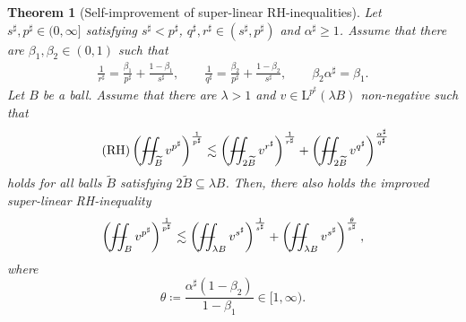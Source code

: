 \documentclass[10pt,a4paper]{amsart}
\newtheorem{theorem}{Theorem}
\renewcommand{\L}{\mathrm{L}}
\def\YYint#1#2#3{{\setbox0=\hbox{$#1{#2#3}{\iint}$}
		\vcenter{\hbox{$#2#3$}}\kern-.51\wd0}}
\def\Yint#1{\mathchoice
	{\YYint\displaystyle\textstyle{#1}}%
	{\YYint\textstyle\scriptstyle{#1}}%
	{\YYint\scriptstyle\scriptscriptstyle{#1}}%
	{\YYint\scriptscriptstyle\scriptscriptstyle{#1}}%
	\!\iint}
\def\longdash{{-}\mkern-3.5mu{-}}
\def\tiltfiint{\Yint\longdash}
\newcommand{\wt}{\widetilde}
\begin{document}
	\begin{theorem}[Self-improvement of super-linear RH-inequalities]
		\label{thm:rh_improvement}
		Let $s^\sharp, p^\sharp \in (0,\infty]$ satisfying $s^\sharp < p^\sharp$, $q^\sharp, r^\sharp \in (s^\sharp, p^\sharp)$ and $\alpha^\sharp \geq 1$. Assume that there are $\beta_1, \beta_2 \in (0,1)$ such that
		\begin{align}
			\label{eq:rh_improvement_relations}
			\frac{1}{r^\sharp} = \frac{\beta_1}{p^\sharp} + \frac{1-\beta_1}{s^\sharp}, \qquad \frac{1}{q^\sharp} = \frac{\beta_2}{p^\sharp} + \frac{1-\beta_2}{s^\sharp}, \qquad \beta_2 \alpha^\sharp = \beta_1.
		\end{align}
		Let $B$ be a ball. Assume that there are $\lambda > 1$ and $v\in \L^{p^\sharp}(\lambda B)$ non-negative such that
		\begin{align}
			\label{eq:RH_assumption}
			\tag{RH}
			\left( \tiltfiint_{\wt B} v^{p^\sharp} \right)^\frac{1}{p^\sharp} \lesssim {\left( \tiltfiint_{2\wt B} v^{r^\sharp} \right)^\frac{1}{r^\sharp} + \left( \tiltfiint_{2\wt B} v^{q^\sharp} \right)^\frac{\alpha^\sharp}{q^\sharp}}
		\end{align}
		holds for all balls $\wt B$ satisfying {$2 \wt B \subseteq \lambda B$}.
		Then, there also holds the improved super-linear RH-inequality
		\begin{align}
			\left( \tiltfiint_{B} v^{p^\sharp} \right)^\frac{1}{p^\sharp} \lesssim \left( \tiltfiint_{\lambda B} v^{s^\sharp} \right)^\frac{1}{s^\sharp} + \left( \tiltfiint_{\lambda B} v^{s^\sharp} \right)^\frac{\theta}{s^\sharp},
		\end{align}
		where $$\theta \coloneqq \frac{\alpha^\sharp (1-\beta_2)}{1-\beta_1} \in [1,\infty).$$
	\end{theorem}
\end{document}
